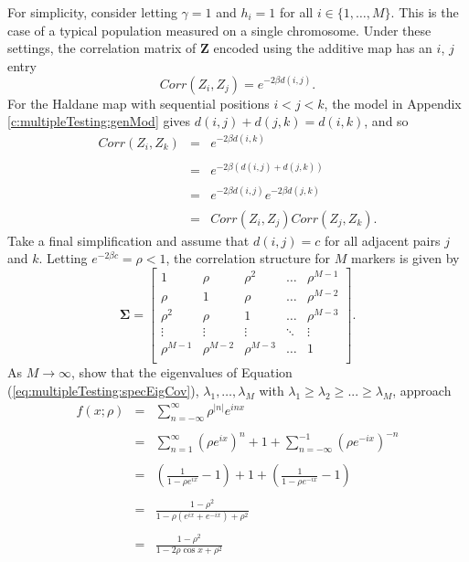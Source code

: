 \documentclass[letterpaper,12pt,oneside,final]{article}
\newcommand{\ve}[1]{\mathbf{#1}}           %
\newcommand{\sm}[1]{\boldsymbol{#1}}   %
\newcommand{\abs}[1]{\lvert{#1}\rvert}              %
\begin{document}
For simplicity, consider letting $\gamma = 1$ and $h_i = 1$ for all $i
\in \{1, \dots, M\}$. This is the case of a typical population measured on a single chromosome. Under these settings, the correlation matrix of $\ve{Z}$ encoded using the additive map has an $i$, $j$ entry
$$Corr(Z_i, Z_j) = e^{-2 \beta d(i,j)}.$$
For the Haldane map with sequential positions $i < j < k$, the model in Appendix \ref{c:multipleTesting:genMod} gives $d(i,j) + d(j,k) = d(i,k)$, and so
$$
\begin{array}{rcl}
Corr(Z_i, Z_k) &=& e^{- 2 \beta d(i,k)}  \\
&&\\
&=&  e^{-2 \beta ( d(i,j) + d(j,k) )} \\
&&\\
&=& e^{-2 \beta d(i,j)} e^{-2 \beta d(j,k)} \\
&&\\
&=&  Corr(Z_i, Z_j) Corr(Z_j, Z_k).
\end{array}
$$
Take a final simplification and assume that $d(i,j) = c$ for all adjacent pairs $j$ and $k$. Letting $e^{-2 \beta c} = \rho < 1$, the correlation structure for $M$ markers is given by
\begin{equation} \label{eq:multipleTesting:specEigCov}
  \sm{\Sigma} = 
  \begin{bmatrix}
    1 & \rho & \rho^2 & \dots & \rho^{M-1} \\
    \rho & 1 & \rho & \dots & \rho^{M-2} \\
    \rho^2 & \rho & 1 & \dots & \rho^{M-3} \\
    \vdots & \vdots & \vdots & \ddots & \vdots \\
    \rho^{M-1} & \rho^{M-2} & \rho^{M-3} & \dots & 1 \\
  \end{bmatrix}.
\end{equation}
As $M \rightarrow \infty$, \cite{grenanderszego1958} show that the eigenvalues of Equation (\ref{eq:multipleTesting:specEigCov}), $\lambda_1, \dots, \lambda_M$ with $\lambda_1 \geq \lambda_2 \geq ... \geq \lambda_M$, approach
\begin{eqnarray}
f(x; \rho) &=& \sum_{n = -\infty}^{\infty} \rho^{\abs{n}}e^{inx} \nonumber \\
&& \nonumber \\
&=& \sum_{n = 1}^{\infty}  \left( \rho e^{ix} \right)^{n} + 1 + \sum_{n = -\infty}^{-1}  \left( \rho e^{-ix} \right)^{-n} \nonumber \\
&& \nonumber \\
&=& \left ( \frac{1}{1 - \rho e^{ix}} - 1 \right ) + 1 + \left ( \frac{1}{1 - \rho e^{-ix}} - 1 \right ) \nonumber \\
&& \nonumber \\
&=& \frac{1 - \rho^2}{1 - \rho (e^{ix} + e^{-ix}) + \rho^2} \nonumber \\
&& \nonumber \\
&=& \frac{1 - \rho^2}{1 - 2\rho \cos x + \rho^2} \nonumber \\  
\label{eq:multipleTesting:fourier}
\end{eqnarray}
\end{document}
